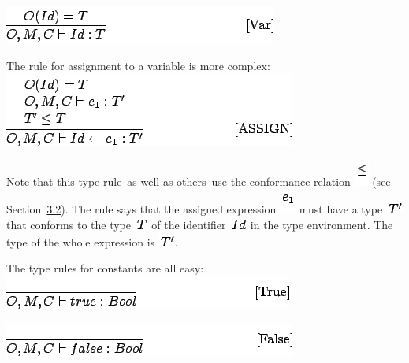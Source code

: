 \documentclass[]{article}
\begin{document}
\includegraphics{img74.png}

The rule for assignment to a variable is more complex: \\

\includegraphics{img75.png}

Note that this type rule--as well as others--use the conformance
relation \includegraphics{img22.png} (see
Section~\href{node6.html\#sec-inherit}{3.2}). The rule says that the
assigned expression \includegraphics{img76.png} must have a type
\includegraphics{img77.png} that conforms to the type
\includegraphics{img58.png} of the identifier
\includegraphics{img73.png} in the type environment. The type of the
whole expression is \includegraphics{img77.png}.

The type rules for constants are all easy: \\

\includegraphics{img78.png}

\includegraphics{img79.png}
\end{document}
